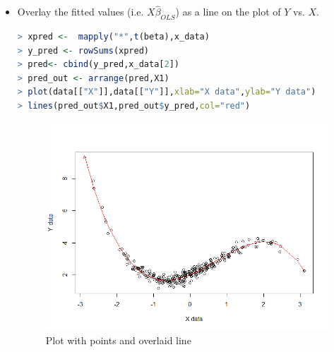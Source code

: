 \documentclass[fontsize=10pt,DIV=14]{scrartcl}
\begin{document}
\begin{enumerate}
\begin{itemize}
		\item
		Overlay the fitted values (i.e. $X\hat{\beta}_{OLS}$) as a line on the plot of $Y$ vs. $X$.
		\begin{lstlisting}[language=R,frame=single]
> xpred <-  mapply("*",t(beta),x_data)
> y_pred <- rowSums(xpred)
> pred<- cbind(y_pred,x_data[2])
> pred_out <- arrange(pred,X1)
> plot(data[["X"]],data[["Y"]],xlab="X data",ylab="Y data")
> lines(pred_out$X1,pred_out$y_pred,col="red")
		\end{lstlisting}
		\begin{figure}[H]
				\begin{center}
					\includegraphics[width=\textwidth]{resources/q1_2_img2.png}
					\caption{Plot with points and overlaid line}
				\end{center}
			\end{figure}
		\end{itemize}
	\end{enumerate}
\end{document}
